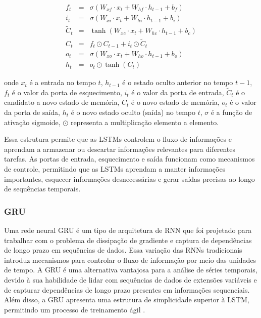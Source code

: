  \begin{eqnarray}
 	f_t &=& \sigma(W_{xf} \cdot x_t + W_{hf} \cdot h_{t-1} + b_f) \\
 	i_t &=& \sigma(W_{xi} \cdot x_t + W_{hi} \cdot h_{t-1} + b_i) \\
 	\tilde{C}_t &=& \tanh(W_{xc} \cdot x_t + W_{hc} \cdot h_{t-1} + b_c) \\
 	C_t &=& f_t \odot C_{t-1} + i_t \odot \tilde{C}_t \\
 	o_t &=& \sigma(W_{xo} \cdot x_t + W_{ho} \cdot h_{t-1} + b_o) \\
 	h_t &=& o_t \odot \tanh(C_t)
 \end{eqnarray}
 
\noindent onde $x_t$ é a entrada no tempo $t$, $h_{t-1}$ é o estado oculto anterior no tempo $t-1$, $f_t$ é o valor da porta de esquecimento, $i_t$ é o valor da porta de entrada, $\tilde{C}_t$ é o candidato a novo estado de memória, $C_t$ é o novo estado de memória, $o_t$ é o valor da porta de saída, $h_t$ é o novo estado oculto (saída) no tempo $t$, $\sigma$ é a função de ativação sigmoide, $\odot$ representa a multiplicação elemento a elemento.
 
 Essa estrutura permite que as LSTMs controlem o fluxo de informações e aprendam a armazenar ou descartar informações relevantes para diferentes tarefas. As portas de entrada, esquecimento e saída funcionam como mecanismos de controle, permitindo que as LSTMs aprendam a manter informações importantes, esquecer informações desnecessárias e gerar saídas precisas ao longo de sequências temporais.
 
 \subsubsection{GRU}
 
Uma rede neural GRU é um tipo de arquitetura de RNN que foi projetado para trabalhar com o problema de dissipação de gradiente e captura de dependências de longo prazo em sequências de dados. Essa variação das RNNs tradicionais introduz mecanismos para controlar o fluxo de informação por meio das unidades de tempo.
A GRU é uma alternativa vantajosa para a análise de séries temporais, devido à sua habilidade de lidar com sequências de dados de extensões variáveis e de capturar dependências de longo prazo presentes em informações sequenciais. Além disso, a GRU apresenta uma estrutura de simplicidade superior à LSTM, permitindo um processo de treinamento ágil  \cite{mastersthesis53fd58a7}.
 
